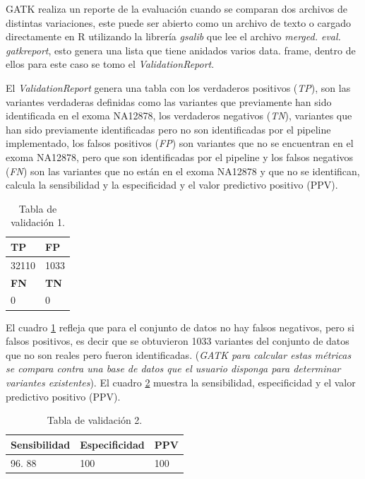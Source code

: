 GATK realiza un reporte de la evaluación cuando se comparan dos archivos de distintas variaciones, este puede ser abierto como un archivo de texto o cargado directamente en R utilizando la librería \textit{gsalib} que lee el archivo \textit{merged. eval. gatkreport}, esto genera una lista que tiene anidados varios data. frame, dentro de ellos para este caso se tomo el \textit{ValidationReport}. 

El \textit{ValidationReport}  genera una tabla con los verdaderos positivos (\textit{TP}), son las variantes verdaderas definidas como las variantes que previamente han sido identificada en el exoma NA12878, los verdaderos negativos (\textit{TN}), variantes que han sido previamente identificadas pero no son identificadas por el pipeline implementado, los falsos positivos (\textit{FP}) son variantes que no se encuentran en el exoma NA12878, pero que son identificadas por el pipeline y los falsos negativos (\textit{FN}) son las variantes que no están en el exoma NA12878 y que no se identifican, calcula la sensibilidad y la especificidad  y el valor predictivo positivo (PPV). 

\begin{table}[H]
	\begin{center}
		\begin{tabular}{|l|l|}
			\hline 
			\textbf{TP} &  \textbf{FP} \\
			\hline 
			32110 & 1033  \\ \hline
			\textbf{FN} &  \textbf{TN} \\
			\hline
			0 &  0\\ \hline
		\end{tabular}
		\caption{Tabla de validación 1. }
		\label{tabla:tabla3}
	\end{center}
\end{table}

El cuadro \ref{tabla:tabla3} refleja que para el conjunto de datos no hay falsos negativos, pero si falsos positivos, es decir  que se obtuvieron 1033 variantes del conjunto de datos que no son reales pero fueron identificadas. (\textit{GATK para calcular estas métricas se compara contra una base de datos que el usuario disponga para determinar variantes existentes}). El cuadro \ref{tabla:tabla4} muestra la sensibilidad, especificidad y el valor predictivo positivo (PPV). 

\begin{table}[h]
	\begin{center}
		\begin{tabular}{|l|l|l|}
			\hline 
			\textbf{Sensibilidad} & \textbf{Especificidad} & \textbf{PPV} \\
			\hline 
			96. 88 & 100 & 100 \\ \hline
		\end{tabular}
		\caption{Tabla de validación 2. }
		\label{tabla:tabla4}
	\end{center}
\end{table}

